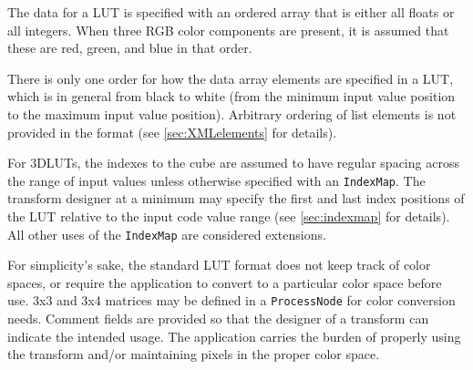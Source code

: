 The data for a LUT is specified with an ordered array that is either all floats or all integers. When three RGB color components are present, it is assumed that these are red, green, and blue in that order.  

There is only one order for how the data array elements are specified in a LUT, which is in general from black to white (from the minimum input value position to the maximum input value position). Arbitrary ordering of list elements is not provided in the format (see \autoref{sec:XMLelements} for details).

For 3DLUTs, the indexes to the cube are assumed to have regular spacing across the range of input values unless otherwise specified with an \texttt{IndexMap}. The transform designer at a minimum may specify the first and last index positions of the LUT relative to the input code value range (see \autoref{sec:indexmap} for details).  All other uses of the \texttt{IndexMap} are considered extensions.

For simplicity's sake, the standard LUT format does not keep track of color spaces, or require the application to convert to a particular color space before use. 3x3 and 3x4 matrices may be defined in a \texttt{ProcessNode} for color conversion needs. Comment fields are provided so that the designer of a transform can indicate the intended usage. The application carries the burden of properly using the transform and/or maintaining pixels in the proper color space.